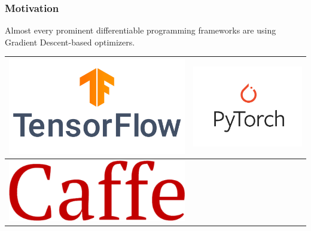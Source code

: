 \documentclass{beamer}
\begin{document}
\begin{frame}
    \frametitle{Motivation}
    Almost every prominent differentiable programming frameworks are using Gradient Descent-based optimizers. 
    
    \begin{table}[]
        \centering
        \begin{tabular}{c|c}
                \includegraphics[scale=0.1]{tf-logo-vertical.png}
 &      \includegraphics[scale=0.15]{pytorch-logo-vertical.png}
\\
\hline
            \includegraphics[scale=0.15]{caffe-logo.png}

\end{tabular}
\end{table}
\end{frame}
\end{document}
